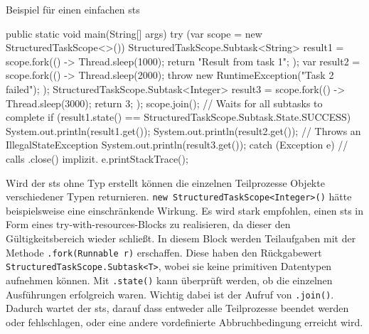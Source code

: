     \begin{program} [H]
        \caption{Beispiel für einen einfachen \gls{sts}}
        \label{prog:BeispielFürEinenEinfachenSts}
    \begin{JavaCode}[language=Java, numbers=left]
public static void main(String[] args) {
    try (var scope = new StructuredTaskScope<>()) {
        StructuredTaskScope.Subtask<String> result1 = scope.fork(() -> {
            Thread.sleep(1000);
            return "Result from task 1";
        });
        var result2 = scope.fork(() -> {
            Thread.sleep(2000);
            throw new RuntimeException("Task 2 failed");
        });
        StructuredTaskScope.Subtask<Integer> result3 = scope.fork(() -> {
            Thread.sleep(3000);
            return 3;
        });
        scope.join();                        // Waits for all subtasks to complete
        if (result1.state() == StructuredTaskScope.Subtask.State.SUCCESS){
            System.out.println(result1.get());  
        } 
        System.out.println(result2.get());   // Throws an IllegalStateException
        System.out.println(result3.get());
    } catch (Exception e) {                 // calls .close() implizit.
        e.printStackTrace();
    }
}\end{JavaCode}
    \end{program}
    Wird der \gls{sts} ohne Typ erstellt können die einzelnen Teilprozesse Objekte verschiedener Typen returnieren. \texttt{new StructuredTaskScope<Integer>()}
    hätte beispielsweise eine einschränkende Wirkung.
    Es wird stark empfohlen, einen \gls{sts} in Form eines try-with-resources-Blocks zu realisieren, da dieser den Gültigkeitsbereich wieder schließt. In diesem Block
    werden Teilaufgaben mit der Methode \texttt{.fork(Runnable r)} erschaffen. Diese haben den Rückgabewert \texttt{StructuredTaskScope.Subtask<T>}, wobei sie keine
    primitiven Datentypen aufnehmen können. Mit \texttt{.state()} kann überprüft werden, ob die einzelnen Ausführungen erfolgreich waren.
    Wichtig dabei ist der Aufruf von \texttt{.join()}. Dadurch wartet der \gls{sts}, darauf dass entweder alle Teilprozesse beendet werden oder fehlschlagen, oder
    eine andere vordefinierte Abbruchbedingung erreicht wird.
    \cite{oracle21STS}

